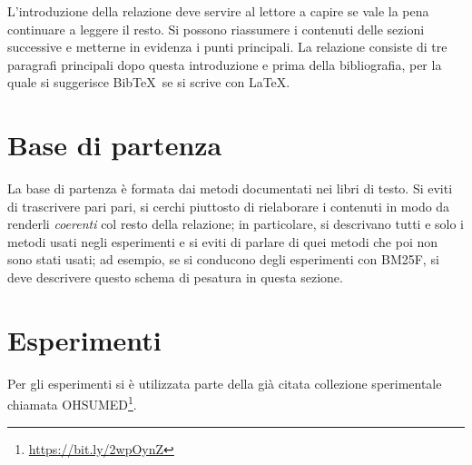 \documentclass[runningheads]{llncs}
\begin{document}
L'introduzione della relazione deve servire al lettore a capire se
vale la pena continuare a leggere il resto.  Si possono riassumere i
contenuti delle sezioni successive e metterne in evidenza i punti
principali.  La relazione consiste di tre paragrafi principali dopo
questa introduzione e prima della bibliografia, per la quale si
suggerisce Bib\TeX\ se si scrive con \LaTeX.

\section{Base di partenza}
\label{sec:base-di-partenza}

La base di partenza \`e formata dai metodi documentati nei libri di
testo.  Si eviti di trascrivere pari pari, si cerchi piuttosto di
rielaborare i contenuti in modo da renderli \emph{coerenti} col resto
della relazione; in particolare, si descrivano tutti e solo i metodi
usati negli esperimenti e si eviti di parlare di quei metodi che poi
non sono stati usati; ad esempio, se si conducono degli esperimenti
con BM25F, si deve descrivere questo schema di pesatura in questa
sezione.
%
%

\section{Esperimenti}
\label{sec:esperimenti}


Per gli esperimenti si \`e utilizzata parte della gi\`a citata collezione sperimentale chiamata OHSUMED\footnote{ \url{https://bit.ly/2wpOynZ}}.
\end{document}
